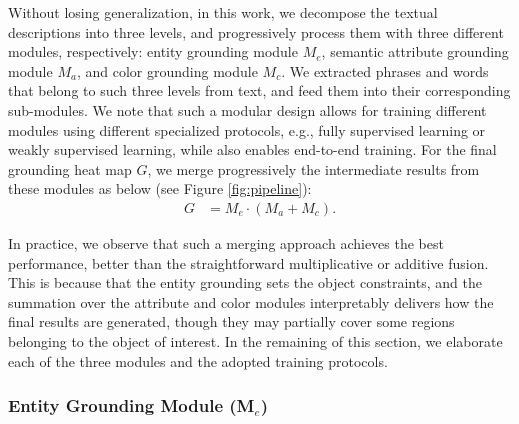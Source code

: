 Without losing generalization,
in this work,
we decompose the textual descriptions into three levels,
and progressively process them with three different modules, respectively:
entity grounding module $M_e$,
semantic attribute grounding module $M_a$, and color grounding module $M_c$.
We extracted phrases and words that belong to such three levels from text, and feed them into their corresponding sub-modules.
We note that such a modular design allows for training different modules using different specialized protocols,
e.g., fully supervised learning or weakly supervised learning,
while also enables end-to-end training.
For the final grounding heat map $G$,
we merge progressively the intermediate results from these modules as below (see Figure \ref{fig:pipeline}):
\begin{equation}
\begin{split}
G & = M_e \cdot (M_a + M_c).
\label{eq:att}
\end{split}
\end{equation}

In practice, we observe that such a merging approach achieves the best
performance, better than the straightforward multiplicative or additive fusion.
This is because that the entity grounding sets the object constraints, and the summation
over the attribute and color modules interpretably delivers how the final results are generated,
though they may partially cover some regions belonging to the object of interest.
In the remaining of this section,
we elaborate each of the three modules and the adopted training protocols.



\subsubsection{Entity Grounding Module (M$_{e}$)}



